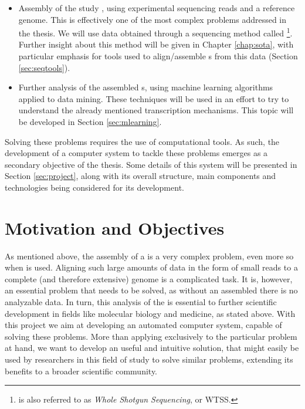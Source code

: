 \begin{itemize}

  \item
  Assembly of the study \trans, using experimental sequencing reads and a
  reference genome. This is effectively one of the most complex problems
  addressed in the thesis. We will use data obtained through a sequencing method
  called \rnaseq{}\footnote{\rnaseq{} is also referred to as \textit{Whole \Trans{}
  Shotgun Sequencing}, or WTSS.}. Further insight about this method will be
  given in Chapter \ref{chap:sota}, with particular emphasis for tools used to
  align/assemble \trans s from this data (Section \ref{sec:seqtools}).

  \item
  Further analysis of the assembled \trans s, using machine learning algorithms
  applied to data mining. These techniques will be used in an effort to try to
  understand the already mentioned transcription mechanisms. This topic will be
  developed in Section \ref{sec:mlearning}.

\end{itemize}

Solving these problems requires the use of computational tools. As such, the
development of a computer system to tackle these problems emerges as a secondary
objective of the thesis. Some details of this system will be presented in
Section \ref{sec:project}, along with its overall structure, main components and
technologies being considered for its development.

\section{Motivation and Objectives} \label{sec:motivation}

As mentioned above, the assembly of a \trans{} is a very complex problem, even
more so when \rnaseq{} is used. Aligning such large amounts of data in the form
of small reads to a complete (and therefore extensive) genome is a complicated
task. It is, however, an essential problem that needs to be solved, as without
an assembled \trans{} there is no analyzable data. In turn, this analysis of the
\trans{} is essential to further scientific development in fields like
molecular biology and medicine, as stated above. With this project we aim at
developing an automated computer system, capable of solving these problems. More
than applying exclusively to the particular problem at hand, we want to develop
an useful and intuitive solution, that might easily be used by researchers in
this field of study to solve similar problems, extending its benefits to a
broader scientific community.

